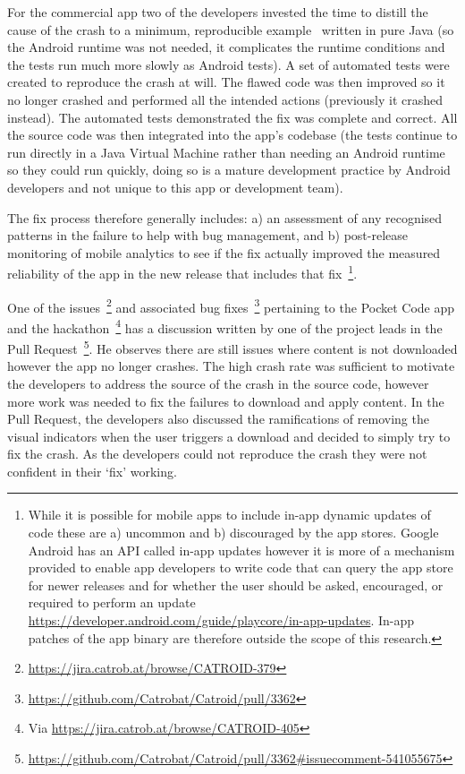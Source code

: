 For the commercial app two of the developers invested the time to distill the cause of the crash to a minimum, reproducible example~\citep{stackoverflow2022_minimal_reproducible_example} written in pure Java (so the Android runtime was not needed, it complicates the runtime conditions and the tests run much more slowly as Android tests). A set of automated tests were created to reproduce the crash at will. The flawed code was then improved so it no longer crashed and performed all the intended actions (previously it crashed instead). The automated tests demonstrated the fix was complete and correct. All the source code was then integrated into the app's codebase (the tests continue to run directly in a Java Virtual Machine rather than needing an Android runtime so they could run quickly, doing so is a mature development practice by Android developers and not unique to this app or development team).


The fix process therefore generally includes: a) an assessment of any recognised patterns in the failure to help with bug management, and b) post-release monitoring of mobile analytics to see if the fix actually improved the measured reliability of the app in the new release that includes that fix~\footnote{While it is possible for mobile apps to include in-app dynamic updates of code these are a) uncommon and b) discouraged by the app stores. Google Android has an API called in-app updates however it is more of a mechanism provided to enable app developers to write code that can query the app store for newer releases and for whether the user should be asked, encouraged, or required to perform an update %
\url{https://developer.android.com/guide/playcore/in-app-updates}. In-app patches of the app binary are therefore outside the scope of this research.}. 

One of the issues~\footnote{\url{https://jira.catrob.at/browse/CATROID-379}} and associated bug fixes~\footnote{\url{https://github.com/Catrobat/Catroid/pull/3362}} pertaining to the Pocket Code app and the hackathon~\footnote{Via \url{https://jira.catrob.at/browse/CATROID-405}} has a discussion written by one of the project leads in the Pull Request~\footnote{\url{https://github.com/Catrobat/Catroid/pull/3362\#issuecomment-541055675}}. 
He observes there are still issues where content is not downloaded however the app no longer crashes. The high crash rate was sufficient to motivate the developers to address the source of the crash in the source code, however more work was needed to fix the failures to download and apply content. In the Pull Request, the developers also discussed the ramifications of removing the visual indicators when the user triggers a download and decided to simply try to fix the crash. As the developers could not reproduce the crash they were not confident in their `fix' working.

